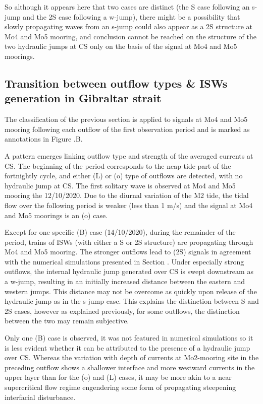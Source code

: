 So although it appears here that two cases are distinct (the S case following an s-jump and the 2S case following a w-jump), there might be a possibility that slowly propagating waves from an s-jump could also appear as a 2S structure at Mo4 and Mo5 mooring, and conclusion cannot be reached on the structure of the two hydraulic jumps at CS only on the basis of the signal at Mo4 and Mo5 moorings.


\subsection{Transition between outflow types \& ISWs generation in Gibraltar strait}

The classification of the previous section is applied to signals at Mo4 and Mo5 mooring following each outflow of the first observation period and is marked as annotations in Figure .B.

A pattern emerges linking outflow type and strength of the averaged currents at CS. The beginning of the period corresponds to the neap-tide part of the fortnightly cycle, and either (L) or (o) type of outflows are detected, with no hydraulic jump at CS. The first solitary wave is observed at Mo4 and Mo5 mooring the 12/10/2020. Due to the diurnal variation of the M2 tide, the tidal flow over the following period is weaker (less than 1 m/s) and the signal at Mo4 and Mo5 moorings is an (o) case.

Except for one specific (B) case (14/10/2020), during the remainder of the period, trains of ISWs (with either a S or 2S structure) are propagating through Mo4 and Mo5 mooring. The stronger outflows lead to (2S) signals in agreement with the numerical simulations presented in Section . Under especially strong outflows, the internal hydraulic jump generated over CS is swept downstream as a w-jump, resulting in an initially increased distance between the eastern and western jumps. This distance may not be overcome as quickly upon release of the hydraulic jump as in the s-jump case. This explains the distinction between S and 2S cases, however as explained previously, for some outflows, the distinction between the two may remain subjective.

Only one (B) case is observed, it was not featured in numerical simulations so it is less evident whether it can be attributed to the presence of a hydraulic jump over CS. Whereas the variation with depth of currents at Mo2-mooring site in the preceding outflow shows a shallower interface and more westward currents in the upper layer than for the (o) and (L) cases, it may be more akin to a near supercritical flow regime engendering some form of propagating steepening interfacial disturbance.

